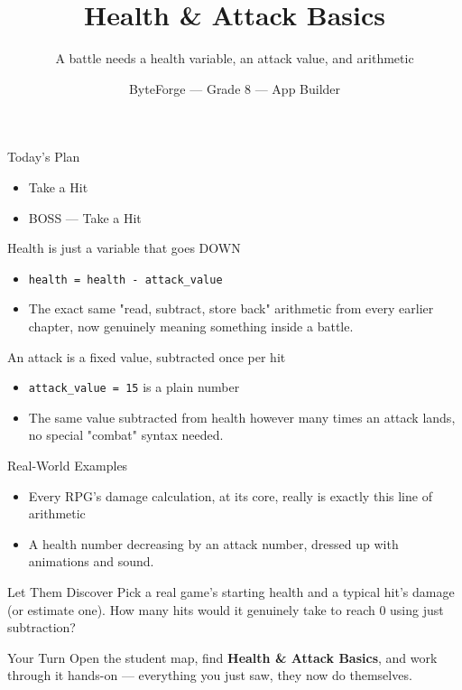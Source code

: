 \documentclass[aspectratio=169]{beamer}
\title{Health \& Attack Basics}
\subtitle{A battle needs a health variable, an attack value, and arithmetic}
\author{ByteForge --- Grade 8 --- App Builder}
\date{}
\begin{document}
\begin{frame}
    \titlepage
\end{frame}

\begin{frame}{Today's Plan}
    \begin{itemize}
        \item Take a Hit
        \item[$\bigstar$] BOSS --- Take a Hit
    \end{itemize}
\end{frame}

\begin{frame}{Health is just a variable that goes DOWN}
    \large
    \begin{itemize}
        \item \texttt{health = health - attack\_value}
        \item The exact same "read, subtract, store back" arithmetic from every earlier chapter, now genuinely meaning something inside a battle.
    \end{itemize}
\end{frame}


\begin{frame}{An attack is a fixed value, subtracted once per hit}
    \large
    \begin{itemize}
        \item \texttt{attack\_value = 15} is a plain number
        \item The same value subtracted from health however many times an attack lands, no special "combat" syntax needed.
    \end{itemize}
\end{frame}

\begin{frame}{Real-World Examples}
    \large
    \begin{itemize}
        \item Every RPG's damage calculation, at its core, really is exactly this line of arithmetic
        \item A health number decreasing by an attack number, dressed up with animations and sound.
    \end{itemize}
\end{frame}


\begin{frame}{Let Them Discover}
    \Large
    Pick a real game's starting health and a typical hit's damage (or estimate one). How many hits would it genuinely take to reach 0 using just subtraction?
\end{frame}

\begin{frame}{Your Turn}
    \Large
    Open the student map, find \textbf{Health \& Attack Basics}, and work through it
    hands-on --- everything you just saw, they now do themselves.
\end{frame}
\end{document}
